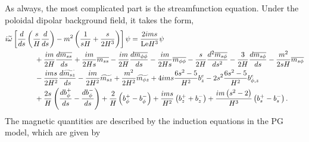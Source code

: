 As always, the most complicated part is the streamfunction equation. Under the poloidal dipolar background field, it takes the form,
\begin{equation}\label{eqn:eigen-pgpsi-poloidal-dipole}
\begin{aligned}
    i\widetilde{\omega} \left[\frac{d}{d s}\left(\frac{s}{H}\frac{d}{d s}\right) - m^2 \left(\frac{1}{sH} + \frac{s}{2H^3}\right)\right] \psi &= \frac{2 i m s}{\mathrm{Le} H^{3}} \psi \\
    &\mkern-240mu + \frac{i m}{2 H} \frac{d\overline{m_{ss}}}{d s} + \frac{i m}{2 H s} \overline{m_{ss}} - \frac{i m}{2 H} \frac{d \overline{m_{\phi\phi}}}{d s} - \frac{i m}{2 H s} \overline{m_{\phi\phi}} - \frac{s}{2 H} \frac{d^{2}\overline{m_{s\phi}}}{d s^{2}} - \frac{3}{2 H} \frac{d\overline{m_{s\phi}}}{d s} - \frac{m^{2}}{2 sH} \overline{m_{s\phi}} \\
    &\mkern-240mu - \frac{i m s}{2 H^{2}} \frac{d\widetilde{m_{sz}}}{d s} - \frac{i m}{2 H^{2}}\widetilde{m_{sz}} + \frac{m^{2}}{2 H^{2}} \widetilde{m_{\phi z}} + 4 i ms\frac{6 s^{2} - 5}{H^{2}} b_{z}^e - 2s^2\frac{6 s^{2} - 5}{H^{2}} b_{\phi, z}^e \\
    &\mkern-240mu + \frac{2 s}{H} \left(\frac{db^{+}_{\phi}}{d s} - \frac{db^{-}_{\phi}}{d s}\right) + \frac{2}{H} \left(b^{+}_{\phi} - b^{-}_{\phi}\right) + \frac{i m s}{H^{2}} \left(b^{+}_{z} + b^{-}_{z}\right) + \frac{i m \left(s^2 - 2\right)}{H^{3}} \left(b^{+}_{s} - b^{-}_{s}\right).
\end{aligned}
\end{equation}
The magnetic quantities are described by the induction equations in the PG model, which are given by
